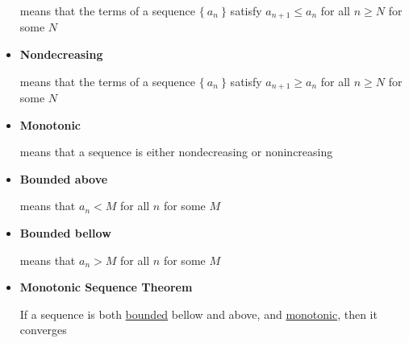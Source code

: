 \documentclass{article}
\begin{document}
\begin{itemize}
means that the terms of a sequence $\{~ a_n ~\}$ satisfy $a_{n+1} \leq a_n$
for all $n \geq N$ for some $N$

\item
\textbf{Nondecreasing}

means that the terms of a sequence $\{~ a_n ~\}$ satisfy $a_{n+1} \geq a_n$
for all $n \geq N$ for some $N$

\item
\textbf{Monotonic}

means that a sequence is either nondecreasing or nonincreasing

\item
\textbf{Bounded above}

means that $a_n<M$ for all $n$ for some $M$

\item
\textbf{Bounded bellow}

means that $a_n>M$ for all $n$ for some $M$

\item
\textbf{Monotonic Sequence Theorem}

If a sequence is both \underline{bounded} bellow and above, and \underline{monotonic},
then it converges

\end{itemize}
\end{document}

